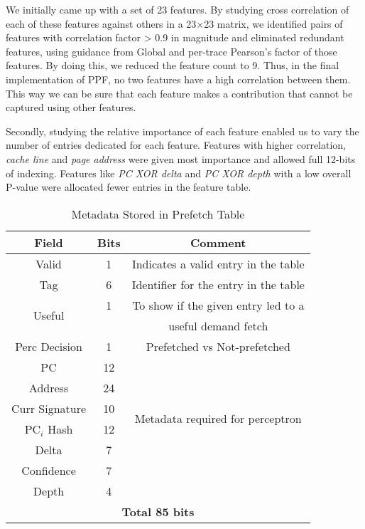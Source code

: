 We initially came up {with} a set of 23 features.  By studying cross
correlation of each of these features against others in a 23$\times$23
matrix, we identified pairs of features with correlation factor > 0.9
in magnitude and eliminated redundant features, using guidance from
Global and per-trace Pearson's factor of those features.  By doing
this, we reduced the feature count to 9.  Thus, in the final
implementation of PPF, no two features have a high correlation between
them. This way we can be sure that each feature makes a contribution
that cannot be captured using other features.

Secondly, studying the relative importance of each feature enabled us
to vary the number of entries dedicated for each feature. Features
with higher correlation, \textit{cache line} and \textit{page address}
were given most importance and allowed full 12-bits of indexing.
Features like \textit{PC XOR delta} and \textit{PC XOR depth} with a
low overall P-value were allocated fewer entries in the feature table.


\begin{table}[ht]
    \centering
    \begin{adjustbox}{width=0.9\columnwidth}
    \begin{tabular}{|c|c|c|}
    \hline
        \textbf{Field} &
        \textbf{Bits} &
        \textbf{Comment} \\
    \hline
         Valid 		& 1  & Indicates a valid entry in the table\\
         Tag 		& 6  & Identifier for the entry in the table\\
         \multirow{2}{1cm}{Useful} 	& 1  & To show if the given entry led to a\\
                    	&    & useful demand fetch\\
         Perc Decision 	& 1  & Prefetched vs Not-prefetched \\
    \hline
        PC 		& 12 & \\
        Address 	& 24 & \\
        Curr Signature 	& 10 & \multirow{2}{4.8cm}{Metadata required for perceptron}\\
	PC$_i$ Hash	& 12 & \multirow{2}{1.1cm}{training}\\
        Delta 		& 7  & \\
        Confidence 	& 7  & \\
	Depth		& 4  & \\
    \hline
        \multicolumn{3}{|c|}{\textbf{Total 85 bits}}\\
    \hline
    \end{tabular}
    \end{adjustbox}
    \caption{Metadata Stored in Prefetch Table}
    \label{tab:PTable_metadata}
\end{table}


